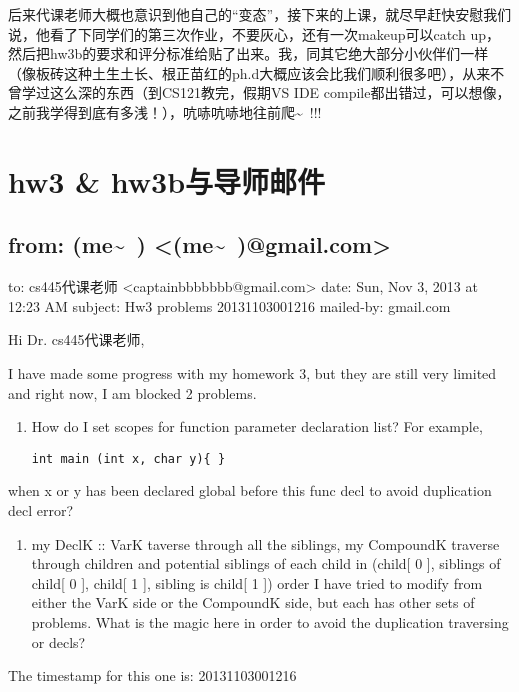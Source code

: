 \documentclass[12pt]{book}
\begin{document}
后来代课老师大概也意识到他自己的“变态”，接下来的上课，就尽早赶快安慰我们说，他看了下同学们的第三次作业，不要灰心，还有一次makeup可以catch up，然后把hw3b的要求和评分标准给贴了出来。我，同其它绝大部分小伙伴们一样（像板砖这种土生土长、根正苗红的ph.d大概应该会比我们顺利很多吧），从来不曾学过这么深的东西（到CS121教完，假期VS IDE compile都出错过，可以想像，之前我学得到底有多浅！），吭哧吭哧地往前爬\textasciitilde{}~!!!

\chapter{hw3 \& hw3b与导师邮件}
\label{sec-28}

\section{from:         (me\textasciitilde{}~) <(me\textasciitilde{}~)@gmail.com>}
\label{sec-28-1}
to:         cs445代课老师 <captainbbbbbbb@gmail.com>
date:         Sun, Nov 3, 2013 at 12:23 AM
subject:         Hw3 problems 20131103001216
mailed-by:         gmail.com

Hi Dr. cs445代课老师, 

I have made some progress with my homework 3, but they are still very limited and right now, I am blocked 2 problems. 

\begin{enumerate}
\item How do I set scopes for function parameter declaration list? For example, 
\lstset{language=java,label= ,caption= ,numbers=none}
\begin{lstlisting}
int main (int x, char y){ }
\end{lstlisting}
\end{enumerate}
when x or y has been declared global before this func decl to avoid duplication decl error?

\begin{enumerate}
\item my DeclK :: VarK taverse through all the siblings, 
 my CompoundK traverse through children and potential siblings of each child in 
 (child[ 0 ], siblings of child[ 0 ], child[ 1 ], sibling is child[ 1 ]) order
I have tried to modify from either the VarK side or the CompoundK side, but each has other sets of problems. What is the magic here in order to avoid the duplication traversing or decls?
\end{enumerate}

The timestamp for this one is: 20131103001216
\end{document}
